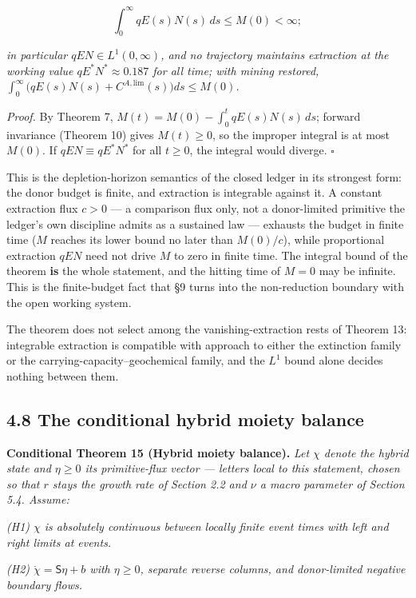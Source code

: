 \documentclass[11pt]{article}
\begin{document}
$$\int_0^\infty qE(s)N(s)\, ds \le M(0) < \infty;$$

 \emph{in particular \(qEN \in L^1(0,\infty)\), and no trajectory maintains extraction at the working value \(qE^*N^* \approx 0.187\) for all time; with mining restored, \(\int_0^\infty \bigl( qE(s)N(s) +\allowbreak{} C^{A,\allowbreak{}\mathrm{lim}}(s) \bigr) ds \le M(0)\).}

\emph{Proof.} By Theorem 7, \(M(t) =\allowbreak{} M(0) - \int_0^t qE(s)N(s)\,\allowbreak{} ds\); forward invariance (Theorem 10) gives \(M(t) \ge 0\), so the improper integral is at most \(M(0)\). If \(qEN \equiv qE^*N^*\) for all \(t \ge 0\), the integral would diverge. \(\square\)

This is the depletion-horizon semantics of the closed ledger in its strongest form: the donor budget is finite, and extraction is integrable against it. A constant extraction flux \(c>0\) --- a comparison flux only, not a donor-limited primitive the ledger's own discipline admits as a sustained law --- exhausts the budget in finite time (\(M\) reaches its lower bound no later than \(M(0)/c\)), while proportional extraction \(qEN\) need not drive \(M\) to zero in finite time. The integral bound of the theorem \textbf{is} the whole statement, and the hitting time of \(M=0\) may be infinite. This is the finite-budget fact that \S9 turns into the non-reduction boundary with the open working system.

The theorem does not select among the vanishing-extraction rests of Theorem 13: integrable extraction is compatible with approach to either the extinction family or the carrying-capacity--geochemical family, and the \(L^1\) bound alone decides nothing between them.

\subsection*{4.8 The conditional hybrid moiety balance}\label{48-the-conditional-hybrid-moiety-balance}

\textbf{Conditional Theorem 15 (Hybrid moiety balance).} \emph{Let \(\chi\) denote the hybrid state and \(\eta \ge 0\) its primitive-flux vector --- letters local to this statement, chosen so that \(r\) stays the growth rate of Section 2.2 and \(\nu\) a macro parameter of Section 5.4. Assume:}

\emph{(H1) \(\chi\) is absolutely continuous between locally finite event times with left and right limits at events.}

\emph{(H2) \(\dot \chi =\allowbreak{} \mathsf{S}\eta +\allowbreak{} b\) with \(\eta \ge 0\), separate reverse columns, and donor-limited negative boundary flows.}
\end{document}
